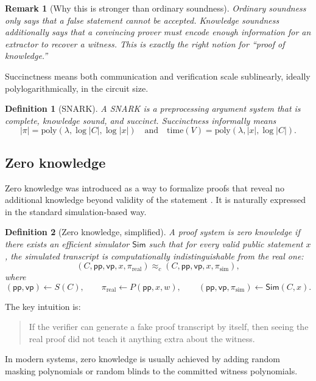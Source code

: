 \documentclass[11pt]{article}
\newcommand{\pp}{\mathsf{pp}}
\newcommand{\vp}{\mathsf{vp}}
\newcommand{\Sim}{\mathsf{Sim}}
\newcommand{\abs}[1]{\left|#1\right|}
\newtheorem{definition}{Definition}
\newtheorem{remark}{Remark}
\begin{document}
\begin{remark}[Why this is stronger than ordinary soundness]
Ordinary soundness only says that a false statement cannot be accepted. Knowledge soundness additionally says that a convincing prover must encode enough information for an extractor to recover a witness. This is exactly the right notion for ``proof of knowledge.''
\end{remark}

Succinctness means both communication and verification scale sublinearly, ideally polylogarithmically, in the circuit size.

\begin{definition}[SNARK]
A SNARK is a preprocessing argument system that is complete, knowledge sound, and succinct. Succinctness informally means
\[
\abs{\pi}=\mathrm{poly}(\lambda,\log |C|,\log |x|)
\quad\text{and}\quad
\mathrm{time}(V)=\mathrm{poly}(\lambda,|x|,\log |C|).
\]
\end{definition}

\subsection{Zero knowledge}

Zero knowledge was introduced as a way to formalize proofs that reveal no additional knowledge beyond validity of the statement \cite{GoldwasserMicaliRackoff1989}. It is naturally expressed in the standard simulation-based way.

\begin{definition}[Zero knowledge, simplified]
A proof system is zero knowledge if there exists an efficient simulator $\Sim$ such that for every valid public statement $x$, the simulated transcript is computationally indistinguishable from the real one:
\[
(C,\pp,\vp,x,\pi_{\mathrm{real}}) \approx_c (C,\pp,\vp,x,\pi_{\mathrm{sim}}),
\]
where
\[
(\pp,\vp)\leftarrow S(C),\qquad \pi_{\mathrm{real}}\leftarrow P(\pp,x,w),\qquad (\pp,\vp,\pi_{\mathrm{sim}})\leftarrow \Sim(C,x).
\]
\end{definition}

The key intuition is:
\begin{quote}
If the verifier can generate a fake proof transcript by itself, then seeing the real proof did not teach it anything extra about the witness.
\end{quote}

In modern systems, zero knowledge is usually achieved by adding random masking polynomials or random blinds to the committed witness polynomials.
\end{document}
